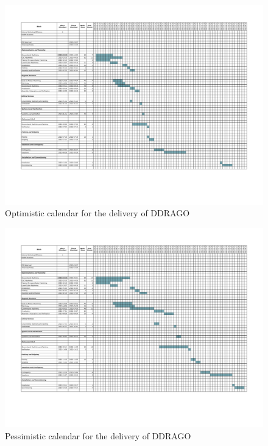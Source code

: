 \documentclass{article}
\begin{document}
\begin{figure}
    \centering
    \includegraphics[angle=90,width=1.0\textwidth]{figures/calendar-optimistic.pdf}
    \caption{Optimistic calendar for the delivery of DDRAGO}
    \label{figure:calendar-optimistic}
\end{figure}

\begin{figure}
    \centering
    \includegraphics[angle=90,width=1.0\textwidth]{figures/calendar-pessimistic.pdf}
    \caption{Pessimistic calendar for the delivery of DDRAGO}
    \label{figure:calendar-pessimistic}
\end{figure}
\end{document}
